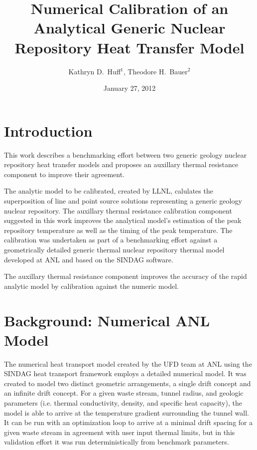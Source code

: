 \documentclass{anstrans}
\title{Numerical Calibration of an Analytical Generic Nuclear Repository Heat 
Transfer Model}
\author{Kathryn D.~Huff$^1$, Theodore H.~Bauer$^2$}
\institute{$^1$Nuclear Engineering \& Engineering Physics Dept., University of 
Wisconsin, Madison, WI, 53706\\
$^2$Nuclear Engineering Division, Argonne National Laboratory, Argonne, IL, 
60439}
\date{January 27, 2012}
\begin{document}
\section{Introduction}

This work describes a benchmarking effort between two generic geology nuclear 
repository heat transfer models and proposes an auxillary thermal resistance 
component to improve their agreement. 

The analytic model to be calibrated, created by \gls{LLNL}, calulates the 
superposition of line and point source solutions representing a generic geology 
nuclear repository. The auxillary thermal resistance calibration component 
suggested in this work improves the analytical model's estimation of the peak 
repository temperature as well as the timing of the peak temperature. The 
calibration was undertaken as part of a benchmarking effort against a 
geometrically detailed generic thermal nuclear repository thermal model 
developed at \gls{ANL} and based on the \gls{SINDAG} 
software\cite{gaski_sinda_1987}.

The auxillary thermal resistance component improves the accuracy of the rapid 
analytic model by calibration against
the numeric model. 





\section{Background: Numerical ANL Model}

The numerical heat transport model created by the UFD team at \gls{ANL} using 
the \gls{SINDAG} heat transport framework employs a detailed numerical  model.  
It was created to model two distinct geometric arrangements, a single drift 
concept and an infinite drift concept.  For a given waste stream, tunnel radius, 
and geologic parameters (i.e.  thermal conductivity, density, and specific heat 
capacity), the model is able to arrive  at the temperature gradient surrounding 
the tunnel wall. It can be run with an optimization loop to arrive at a minimal 
drift spacing for a given waste stream in agreement with user input thermal 
limits, but in this validation effort it was run deterministically from 
benchmark parameters. 
\end{document}
